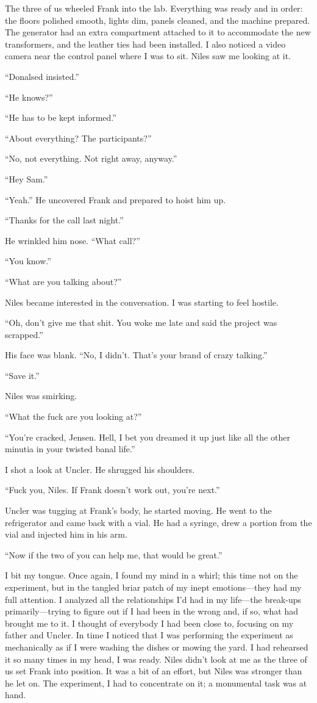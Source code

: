 \documentclass[
]{article}
\begin{document}
The three of us wheeled Frank into the lab. Everything was ready and in
order: the floors polished smooth, lights dim, panels cleaned, and the
machine prepared. The generator had an extra compartment attached to it
to accommodate the new transformers, and the leather ties had been
installed. I also noticed a video camera near the control panel where I
was to sit. Niles saw me looking at it.

``Donalsed insisted.''

``He knows?''

``He has to be kept informed.''

``About everything? The participants?''

``No, not everything. Not right away, anyway.''

``Hey Sam.''

``Yeah.'' He uncovered Frank and prepared to hoist him up.

``Thanks for the call last night.''

He wrinkled him nose. ``What call?''

``You know.''

``What are you talking about?''

Niles became interested in the conversation. I was starting to feel
hostile.

``Oh, don't give me that shit. You woke me late and said the project was
scrapped.''

His face was blank. ``No, I didn't. That's your brand of crazy
talking.''

``Save it.''

Niles was smirking.

``What the fuck are you looking at?''

``You're cracked, Jensen. Hell, I bet you dreamed it up just like all
the other minutia in your twisted banal life.''

I shot a look at Uncler. He shrugged his shoulders.

``Fuck you, Niles. If Frank doesn't work out, you're next.''

Uncler was tugging at Frank's body, he started moving. He went to the
refrigerator and came back with a vial. He had a syringe, drew a portion
from the vial and injected him in his arm.

``Now if the two of you can help me, that would be great.''

I bit my tongue. Once again, I found my mind in a whirl; this time not
on the experiment, but in the tangled briar patch of my inept
emotions---they had my full attention. I analyzed all the relationships
I'd had in my life---the break-ups primarily---trying to figure out if I
had been in the wrong and, if so, what had brought me to it. I thought
of everybody I had been close to, focusing on my father and Uncler. In
time I noticed that I was performing the experiment as mechanically as
if I were washing the dishes or mowing the yard. I had rehearsed it so
many times in my head, I was ready. Niles didn't look at me as the three
of us set Frank into position. It was a bit of an effort, but Niles was
stronger than he let on. The experiment, I had to concentrate on it; a
monumental task was at hand.
\end{document}

